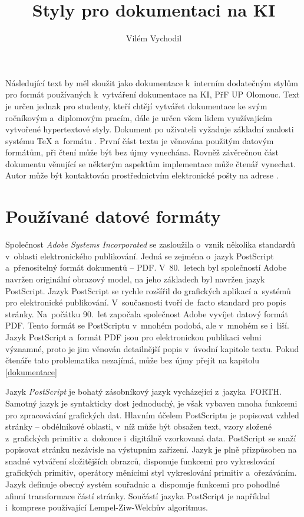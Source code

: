 \documentclass[12pt]{article}
\begin{document}
\title{Styly pro dokumentaci na KI}
\author{Vilém Vychodil}


\maketitle

\begin{abstrakt}
  Následující text by měl sloužit jako dokumentace k~interním dodatečným stylům
  pro formát \LaTeXE{} používaných k~vytváření dokumentace na 
  KI, PřF UP Olomouc. Text je určen jednak pro studenty, kteří chtějí vytvářet
  dokumentace ke svým ročníkovým a~diplomovým pracím, dále je určen všem lidem
  využívajícím vytvořené hypertextové styly.
  Dokument po uživateli vyžaduje základní znalosti systému \TeX{} 
  a~formátu \LaTeXE. První část textu je věnována použitým datovým formátům,
  při čtení může být bez újmy vynechána. Rovněž závěrečnou část dokumentu 
  věnující se některým aspektům implementace může čtenář vynechat.
  Autor může být kontaktován prostřednictvím elektronické pošty na
  adrese\/ .
\end{abstrakt}

\section{Používané datové formáty}
Společnost \emph{Adobe Systems Incorporated} se zasloužila
o~vznik několika standardů
v~oblasti elektronického publikování. Jedná se zejména o~jazyk
PostScript 
a~přenositelný formát dokumentů -- PDF.
V~80.~letech byl společností Adobe navržen originální 
obrazový model,
na jeho základech byl navržen jazyk PostScript. Jazyk PostScript se rychle
rozšířil do grafických aplikací a~systémů pro elektronické publikování.
V~současnosti tvoří de~facto standard pro popis stránky.
Na~počátku 90.~let započala společnost Adobe vyvíjet datový formát PDF.
Tento formát se PostScriptu v~mnohém podobá, ale v~mnohém se i~liší.
Jazyk PostScript a~formát PDF jsou pro elektronickou publikaci velmi
významné, proto je jim věnován detailnější popis v~úvodní kapitole textu.
Pokud čtenáře tato problematika nezajímá, může bez újmy přejít 
na kapitolu \ref{dokumentace}

\medskip
Jazyk \emph{PostScript} je bohatý zásobníkový jazyk vycházející
z~jazyka~FORTH. Samotný jazyk je syntakticky dost jednoduchý,
je však vybaven mnoha funkcemi pro zpracovávání grafických dat.
Hlavním účelem PostScriptu je popisovat vzhled stránky -- obdélníkové
oblasti, v~níž může být obsažen text, vzory složené z~grafických
primitiv a~dokonce i~digitálně vzorkovaná data.
PostScript se snaží popisovat
stránku nezávisle na výstupním zařízení.
Jazyk je plně přizpůsoben na snadné vytváření složitějších obrazců,
disponuje funkcemi pro vykreslování grafických primitiv,
operátory měnícími styl
vykreslování primitiv a~ořezáváním. Jazyk definuje obecný systém
souřadnic a~disponuje funkcemi pro pohodlné afinní transformace
částí stránky. Součástí jazyka PostScript je například i~komprese
používající Lempel-Ziw-Welchův algoritmus.
\end{document}
